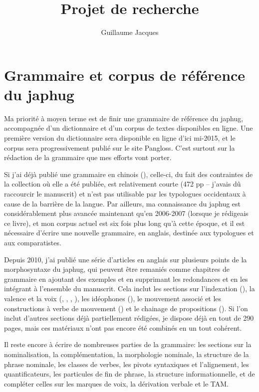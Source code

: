 \documentclass[oldfontcommands,oneside,a4paper,11pt]{article}
\begin{document}
\title{Projet de recherche}
\author{Guillaume Jacques}
\maketitle

\sloppy
\tableofcontents
\section{Grammaire et corpus de référence du japhug}
Ma priorité à moyen terme est de finir une grammaire de référence du japhug, accompagnée d'un dictionnaire et d'un corpus de textes disponibles en ligne. Une première version du dictionnaire sera disponible en ligne d'ici mi-2015, et le corpus sera progressivement publié sur le site Pangloss. C'est surtout sur la rédaction de la grammaire que mes efforts vont porter.

Si j'ai déjà publié une grammaire en chinois (\citealt{jacques08zh}), celle-ci, du fait des contraintes de la collection où elle a été publiée, est relativement courte (472 pp -- j'avais dû raccourcir le manuscrit) et n'est pas utilisable par les typologues occidentaux à cause de la barrière de la langue. Par ailleurs, ma connaissance du japhug est considérablement plus avancée maintenant qu'en 2006-2007 (lorsque je rédigeais ce livre), et mon corpus actuel est six fois plus long qu'à cette époque, et il est nécessaire d'écrire une nouvelle grammaire, en anglais, destinée aux typologues et aux comparatistes.

Depuis 2010, j'ai publié une série d'articles en anglais sur plusieurs points de la morphosyntaxe du japhug, qui peuvent être remaniés comme chapitres de grammaire en ajoutant des exemples et en supprimant les redondances et en les intégrant à l'ensemble du manuscrit. Cela inclut les sections sur l'indexation (\citealt{jacques10inverse}), la valence et la voix (\citealt{jacques12demotion}, \citealt{jacques12incorp}, \citealt{jacques13tropative},   \citealt{jacques14antipassive}), les idéophones (\citealt{japhug14ideophones}), le mouvement associé et les constructions à verbe de mouvement (\citealt{jacques13harmonization}) et le chainage de propositions (\citealt{jacques14linking}). Si l'on inclut d'autres sections déjà partiellement rédigées, je dispose déjà en tout de 290 pages, mais ces matériaux n'ont pas encore été combinés en un  tout cohérent.

Il reste encore à écrire de nombreuses parties de la grammaire: les sections sur la nominalisation, la complémentation, la morphologie nominale, la structure de la phrase nominale, les classes de verbes, les pivots syntaxiques et l'alignement, les quantificateurs, les particules de fin de phrase, la structure informationnelle, et de compléter celles sur les marques de voix, la dérivation verbale et le TAM.
\end{document}
